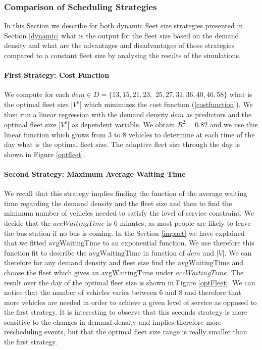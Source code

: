 \documentclass[12pt,a4paper]{article}
\begin{document}
\subsubsection{Comparison of Scheduling Strategies}
In this Section we describe for both dynamic fleet size strategies presented in Section \ref{dynamic} what is the output for the fleet size based on the demand density and what are the advantages and disadvantages of those strategies compared to a constant fleet size by analysing the results of the simulations.
\paragraph{First Strategy: Cost Function}
We compute for each $dem \in D =  \{13, 15, 21, 23,$ $25, 27, 31, 36, 40, 46, 58\}$ what is the optimal fleet size $|V^{o}|$ which minimizes the cost function (\ref{costfunction}). We then run a linear regression with the demand density $dem$ as predictors and the optimal fleet size $|V^{o}|$ as dependent variable. We obtain $R^{2} = 0.82$ and we use this linear function which grows from 3 to 8 vehicles to determine at each time of the day what is the optimal fleet size. The adaptive fleet size through the day is shown in Figure \ref{optfleet}.
  
\paragraph{Second Strategy: Maximum Average Waiting Time}
We recall that this strategy implies finding the function of the average waiting time regarding the demand density and the fleet size and then to find the minimum number of vehicles needed to satisfy the level of service constraint. We decide that the $accWaitingTime$ is 6 minutes, as most people are likely to leave the bus station if no bus is coming. In the Section \ref{impact} we have explained that we fitted $\text{avgWaitingTime}$ to an exponential function. We use therefore this function fit to describe the $\text{avgWaitingTime}$ in function of $dem$ and $|V|$. We can therefore for any demand density and fleet size find the $\text{avgWaitingTime}$ and choose the fleet which gives an $\text{avgWaitingTime}$ under $accWaitingTime$. The result over the day of the optimal fleet size is shown in Figure \ref{optFleet}. We can notice that the number of vehicles varies between 6 and 8 and therefore that more vehicles are needed in order to achieve a given level of service as opposed to the first strategy. It is interesting to observe that this seconds strategy is more sensitive to the changes in demand density and implies therefore more rescheduling events, but that the optimal fleet size range is really smaller than the first strategy. 
\end{document}
